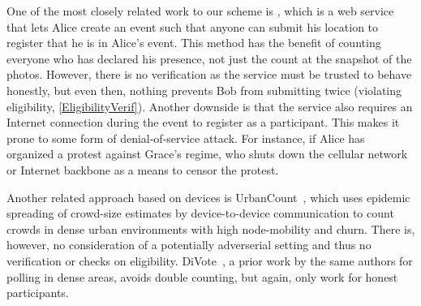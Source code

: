 One of the most closely related work to our scheme is \citet{CrowdCount}, which is a web service that lets Alice create an event such that anyone can submit his location to register that he is in Alice's event.
This method has the benefit of counting everyone who has declared his presence, not just the count at the snapshot of the photos.
However, there is no verification as the service must be trusted to behave honestly, but even then, nothing prevents Bob from submitting twice (violating eligibility, \cref{EligibilityVerif}).
Another downside is that the service also requires an Internet connection during the event to register as a participant.
This makes it prone to some form of denial-of-service attack.
For instance, if Alice has organized a protest against Grace's regime, who shuts 
down the cellular network or Internet backbone as a means to censor the protest.

Another related approach based on devices is UrbanCount~\cite{UrbanCount}, which 
uses epidemic spreading of crowd-size estimates by device-to-device 
communication to count crowds in dense urban environments with high 
node-mobility and churn. There is, however, no consideration of a potentially 
adverserial setting and thus no verification or checks on eligibility. 
DiVote~\cite{DiVote}, a prior work by the same authors for polling in dense 
areas, avoids double counting, but again, only work for honest participants.



